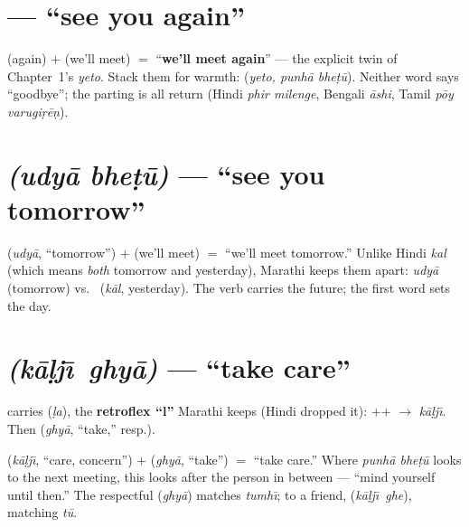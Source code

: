 \section{ --- ``see you again''}
\label{lesson:punha-bhetu}

 (again) $+$  (we'll meet) $=$ ``\textbf{we'll meet again}''
--- the explicit twin of Chapter~1's \emph{yeto}. Stack them for warmth:
 (\emph{yeto, punh\=a bhe\d{t}\=u}). Neither word says
``goodbye''; the parting is all return (Hindi \emph{phir milenge}, Bengali
\emph{\=ashi}, Tamil \emph{p\=oy varugi\d{r}\=e\d{n}}).

\section{ \emph{(udy\=a bhe\d{t}\=u)} --- ``see you tomorrow''}
\label{lesson:udya-bhetu}

\begin{cousinweb}
 (\emph{udy\=a}, ``tomorrow'') $+$  (we'll meet) $=$ ``we'll
meet tomorrow.'' Unlike Hindi \emph{kal} (which means \emph{both} tomorrow and
yesterday), Marathi keeps them apart: \emph{udy\=a} (tomorrow) vs.\ 
(\emph{k\=al}, yesterday). The verb carries the future; the first word sets the
day.
\end{cousinweb}

\section{ \emph{(k\=a\d{l}j\=\i\ ghy\=a)} --- ``take care''}
\label{lesson:kalji-ghya}

\begin{sounds}
 carries  (\emph{\d{l}a}), the \textbf{retroflex ``l''} Marathi
keeps (Hindi dropped it): $+$$+$ $\to$ \emph{k\=a\d{l}j\=\i}.
Then  (\emph{ghy\=a}, ``take,'' resp.).
\end{sounds}

\begin{cousinweb}
 (\emph{k\=a\d{l}j\=\i}, ``care, concern'') $+$  (\emph{ghy\=a},
``take'') $=$ ``take care.'' Where \emph{punh\=a bhe\d{t}\=u} looks to the next
meeting, this looks after the person in between --- ``mind yourself until then.''
The respectful  (\emph{ghy\=a}) matches \emph{tumh\=\i}; to a friend,
 (\emph{k\=a\d{l}j\=\i\ ghe}), matching \emph{t\=u}.
\end{cousinweb}

